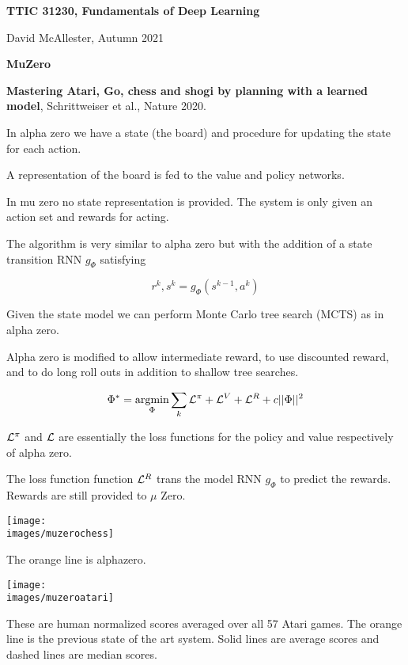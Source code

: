 




{\Huge

  \centerline{\bf TTIC 31230, Fundamentals of Deep Learning}
  \bigskip
  \centerline{David McAllester, Autumn 2021}

  \vfill
  \centerline{\bf MuZero}
  \vfill
  \vfill


{\bf Mastering Atari, Go, chess and shogi by planning with a learned model}, Schrittweiser et al., Nature 2020.

\vfill
In alpha zero we have a state (the board) and procedure for updating the state for each action.

\vfill
A representation of the board is fed to the value and policy networks.

\vfill
In mu zero no state representation is provided.  The system is only given an action set and rewards for acting.



The algorithm is very similar to alpha zero but with the addition of a state transition RNN $g_\Phi$ satisfying

\vfill
$$r^k,s^k = g_\Phi(s^{k-1},a^k)$$

\vfill
Given the state model we can perform Monte Carlo tree search (MCTS) as in alpha zero.

\vfill
Alpha zero is modified to allow intermediate reward, to use discounted reward, and to do long roll outs in addition to shallow tree searches.


$$\Phi^* = \operatorname*{argmin}_\Phi \sum_k {\cal L}^\pi + {\cal L}^V +{\cal L}^R + c||\Phi||^2$$

\vfill
${\cal L}^\pi$ and ${\cal L}$ are essentially the loss functions for the policy and value respectively of alpha zero.

\vfill
The loss function function ${\cal L}^R$ trans the model RNN $g_\Phi$ to predict the rewards.  Rewards are still provided to $\mu$ Zero.


\centerline{\texttt{[image: \\images/muzerochess]}}

The orange line is alphazero.


\centerline{\texttt{[image: \\images/muzeroatari]}}

{\huge
  These are human normalized scores averaged over all 57 Atari games.  The orange line is the previous state of the art system.  Solid lines are average scores and dashed lines are median scores.
}


}



